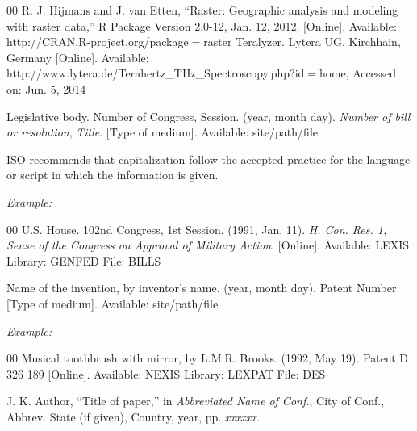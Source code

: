 \documentclass[journal,onecolumn,web]{ieeecolor}
\begin{document}
\begin{thebibliography}{00}
 R. J. Hijmans and J. van Etten, ``Raster: Geographic analysis and modeling with raster data,'' R Package Version 2.0-12, Jan. 12, 2012. [Online]. Available:  {http://CRAN.R-project.org/package$=$raster} {}
 Teralyzer. Lytera UG, Kirchhain, Germany [Online]. Available: http://www.lytera.de/Terahertz\_THz\_Spectroscopy.php?id$=$home, Accessed on: Jun. 5, 2014
\end{thebibliography}


\noindent Legislative body. Number of Congress, Session. (year, month day). {\it Number of bill or resolution}, {\it Title}. [Type
of medium]. Available: site/path/file

 ISO recommends that capitalization follow the accepted
practice for the language or script in which the information is given.



{\it Example:}{\vadjust{\vspace*{-2.5em}}}

\begin{thebibliography}{00}
 U.S. House. 102nd Congress, 1st Session. (1991, Jan. 11). {\it H. Con. Res. 1, Sense of the Congress on Approval of Military Action}. [Online]. Available: LEXIS Library: GENFED File: BILLS
\end{thebibliography}


\noindent Name of the invention, by inventor's name. (year, month day). Patent Number  [Type
of medium]. Available:  {site/path/file}

{\it Example:}{\vadjust{\vspace*{-2.5em}}}

\begin{thebibliography}{00}
 Musical toothbrush with mirror, by L.M.R. Brooks. (1992, May 19). Patent D 326 189 [Online]. Available: NEXIS Library: LEXPAT File: DES
\end{thebibliography}



\noindent J. K. Author, ``Title of paper,'' in {\it Abbreviated Name of Conf.}, City of Conf., Abbrev. State (if
given), Country, year, pp. {\it xxxxxx.}
\end{document}
